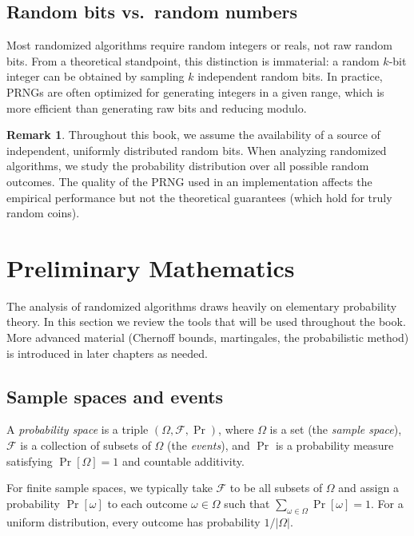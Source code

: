 \documentclass[twoside,12pt]{book}
\theoremstyle{plain}
\theoremstyle{definition}
\newtheorem{remark}[theorem]{Remark}
\theoremstyle{remark}
\begin{document}
\subsection{Random bits vs.\ random numbers}

Most randomized algorithms require random integers or reals, not raw random
bits. From a theoretical standpoint, this distinction is immaterial: a
random $k$-bit integer can be obtained by sampling $k$ independent random
bits. In practice, PRNGs are often optimized for generating integers in a
given range, which is more efficient than generating raw bits and reducing
modulo.

\begin{remark}
Throughout this book, we assume the availability of a source of independent,
uniformly distributed random bits. When analyzing randomized algorithms, we
study the probability distribution over all possible random outcomes. The
quality of the PRNG used in an implementation affects the empirical
performance but not the theoretical guarantees (which hold for truly random
coins).
\end{remark}

\section{Preliminary Mathematics}
\label{sec:prelim-math}

The analysis of randomized algorithms draws heavily on elementary
probability theory. In this section we review the tools that will be used
throughout the book. More advanced material (Chernoff bounds, martingales,
the probabilistic method) is introduced in later chapters as needed.

\subsection{Sample spaces and events}

A \emph{probability space} is a triple $(\Omega, \mathcal{F}, \Pr)$,
where $\Omega$ is a set (the \emph{sample space}), $\mathcal{F}$ is a
collection of subsets of $\Omega$ (the \emph{events}), and $\Pr$ is a
probability measure satisfying $\Pr[\Omega]=1$ and countable additivity.

For finite sample spaces, we typically take $\mathcal{F}$ to be all subsets
of $\Omega$ and assign a probability $\Pr[\omega]$ to each outcome
$\omega \in \Omega$ such that $\sum_{\omega \in \Omega} \Pr[\omega] = 1$.
For a uniform distribution, every outcome has probability $1/|\Omega|$.
\end{document}
